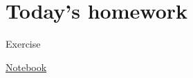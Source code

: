 \section{Today's homework}

\begin{frame}[containsverbatim]{Exercise}
    \begin{center}
        \href{https://colab.research.google.com/drive/1bB0Bo8RohF192g8ikRkuzW_ZQXi1kFeS}{Notebook}
    \end{center}
\end{frame}

